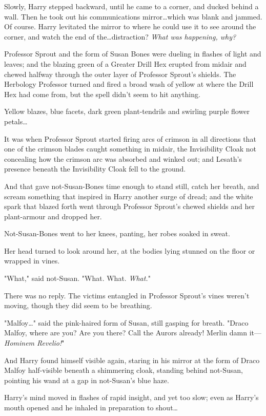 Slowly, Harry stepped backward, until he came to a corner, and ducked behind a
wall. Then he took out his communications mirror…which was blank and
jammed. Of course. Harry levitated the mirror to where he could use it to see
around the corner, and watch the end of the…distraction? \emph{What was
happening, why?}

Professor Sprout and the form of Susan Bones were dueling in flashes of light
and leaves; and the blazing green of a Greater Drill Hex erupted from midair
and chewed halfway through the outer layer of Professor Sprout's shields. The
Herbology Professor turned and fired a broad wash of yellow at where the Drill
Hex had come from, but the spell didn't seem to hit anything.

Yellow blazes, blue facets, dark green plant-tendrils and swirling purple
flower petals…

It was when Professor Sprout started firing arcs of crimson in all directions
that one of the crimson blades caught something in midair, the Invisibility
Cloak not concealing how the crimson arc was absorbed and winked out; and
Lesath's presence beneath the Invisibility Cloak fell to the ground.

And that gave not-Susan-Bones time enough to stand still, catch her breath, and
scream something that inspired in Harry another surge of dread; and the white
spark that blazed forth went through Professor Sprout's chewed shields and her
plant-armour and dropped her.

Not-Susan-Bones went to her knees, panting, her robes soaked in sweat.

Her head turned to look around her, at the bodies lying stunned on the floor or
wrapped in vines.

"What," said not-Susan. "What. What. \emph{What.}"

There was no reply. The victims entangled in Professor Sprout's vines weren't
moving, though they did seem to be breathing.

"Malfoy…" said the pink-haired form of Susan, still gasping for breath.
"Draco Malfoy, where are you? Are you there? Call the Aurors already! Merlin
damn it—\emph{Hominem Revelio!}"

And Harry found himself visible again, staring in his mirror at the form of
Draco Malfoy half-visible beneath a shimmering cloak, standing behind
not-Susan, pointing his wand at a gap in not-Susan's blue haze.

Harry's mind moved in flashes of rapid insight, and yet too slow; even as
Harry's mouth opened and he inhaled in preparation to shout…


